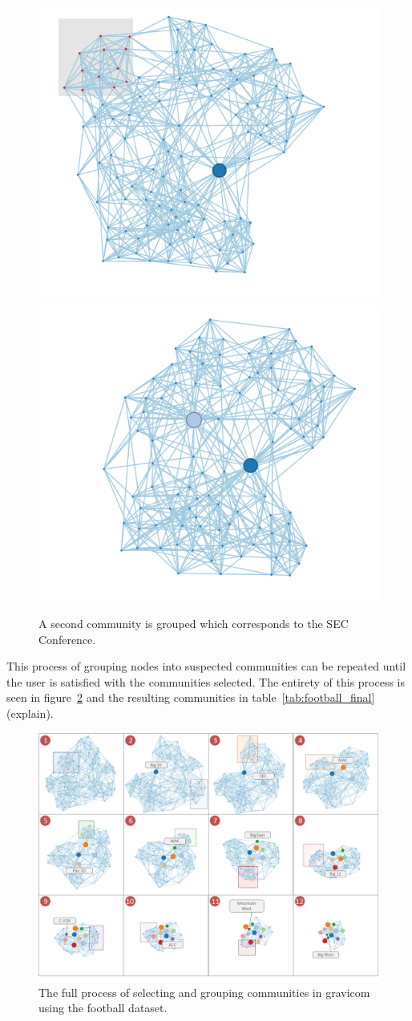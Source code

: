 \documentclass{article}\usepackage[]{graphicx}\usepackage[]{color}
\newcommand{\ak}[1]{{\color{blue} #1}}
\begin{document}
\begin{figure}[H]
\centering
\includegraphics[width=.49\textwidth]{images/football_45.png}
\includegraphics[width=.49\textwidth]{images/football_6.png}
\caption{\label{fig:football_6} A second community is grouped which corresponds to the SEC Conference.}
\end{figure}

This process of grouping nodes into suspected communities can be repeated until the user is satisfied with the communities selected. The entirety of this process is seen in figure~\ref{fig:football_progression} and the resulting communities in table~\ref{tab:football_final} \ak{(explain)}. 

\begin{figure}[H]
\centering
\includegraphics[width=\textwidth]{images/football_progression.png}
\caption{\label{fig:football_progression}The full process of selecting and grouping communities in gravicom using the football dataset.}
\end{figure}
\end{document}
